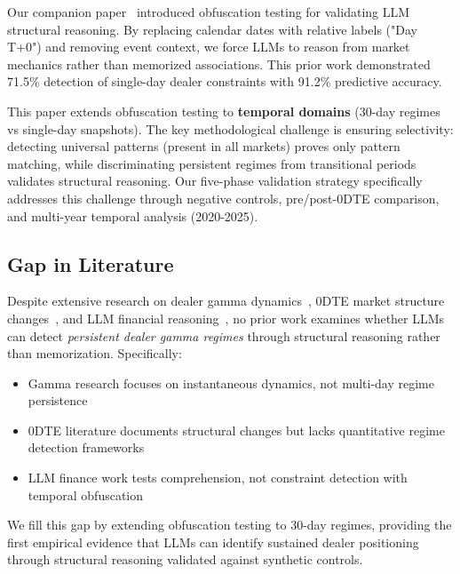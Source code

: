 Our companion paper~\cite{regan2025obfuscation} introduced obfuscation testing for validating LLM structural reasoning. By replacing calendar dates with relative labels ("Day T+0") and removing event context, we force LLMs to reason from market mechanics rather than memorized associations. This prior work demonstrated 71.5\% detection of single-day dealer constraints with 91.2\% predictive accuracy.

This paper extends obfuscation testing to \textbf{temporal domains} (30-day regimes vs single-day snapshots). The key methodological challenge is ensuring selectivity: detecting universal patterns (present in all markets) proves only pattern matching, while discriminating persistent regimes from transitional periods validates structural reasoning. Our five-phase validation strategy specifically addresses this challenge through negative controls, pre/post-0DTE comparison, and multi-year temporal analysis (2020-2025).

\subsection{Gap in Literature}

Despite extensive research on dealer gamma dynamics~\cite{ni2005stock,baltussen2021hedging}, 0DTE market structure changes~\cite{dim2025zero}, and LLM financial reasoning~\cite{lopez2023can,kim2024financial}, no prior work examines whether LLMs can detect \textit{persistent dealer gamma regimes} through structural reasoning rather than memorization. Specifically:

\begin{itemize}
\item Gamma research focuses on instantaneous dynamics, not multi-day regime persistence
\item 0DTE literature documents structural changes but lacks quantitative regime detection frameworks
\item LLM finance work tests comprehension, not constraint detection with temporal obfuscation
\end{itemize}

We fill this gap by extending obfuscation testing to 30-day regimes, providing the first empirical evidence that LLMs can identify sustained dealer positioning through structural reasoning validated against synthetic controls.
